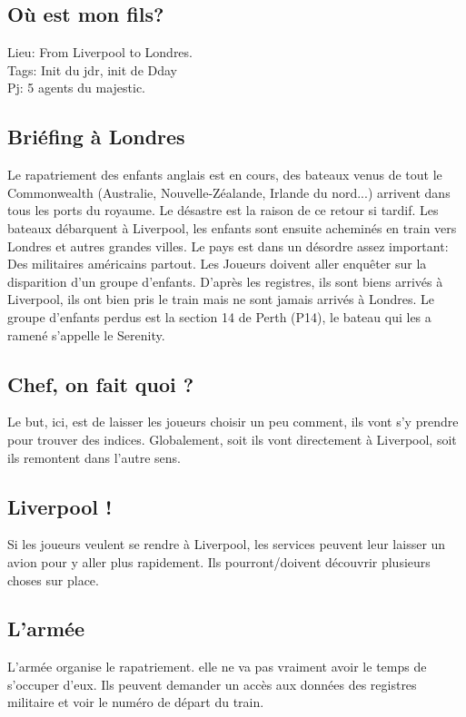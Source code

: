 \documentclass[oneside,12pt]{book}
\begin{document}
\begin{flushleft}
\chapter{Où est mon fils?}


Lieu: From Liverpool to Londres. \\
Tags: Init du jdr, init de Dday \\

Pj: 5 agents du majestic. \\


\section{Briéfing à Londres}
Le rapatriement des enfants anglais est en cours, des bateaux venus de tout le Commonwealth (Australie, Nouvelle-Zéalande, Irlande du nord...) arrivent dans tous les ports du royaume. Le désastre est la raison de ce retour si tardif. 
Les bateaux débarquent à Liverpool, les enfants sont ensuite acheminés en train vers Londres et autres grandes villes. 
Le pays est dans un désordre assez important: Des militaires américains partout.
Les Joueurs doivent aller enquêter sur la disparition d’un groupe d’enfants. D’après les registres, ils sont biens arrivés à Liverpool, ils ont bien pris le train mais ne sont jamais arrivés à Londres.
Le groupe d’enfants perdus est la section 14 de Perth (P14), le bateau qui les a ramené s’appelle le Serenity.


\section{Chef, on fait quoi ?}
Le but, ici, est de laisser les joueurs choisir un peu comment, ils vont s’y prendre pour trouver des indices. Globalement, soit ils vont directement à Liverpool, soit ils remontent dans l'autre sens. 

\section{Liverpool !}
Si les joueurs veulent se rendre à Liverpool, les services peuvent leur laisser un avion  pour y aller plus rapidement. Ils pourront/doivent découvrir plusieurs choses sur place.

\section{L'armée}
L'armée organise le rapatriement. elle ne va pas vraiment avoir le temps de s’occuper d’eux. Ils peuvent demander un accès aux données des registres militaire et voir le numéro de départ du train.


\end{flushleft}
\end{document}
